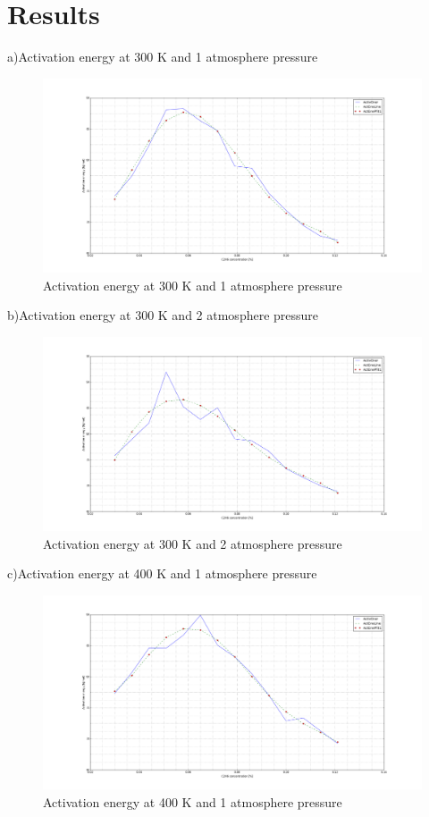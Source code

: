 \documentclass[a4paper]{article}
\begin{document}
\section{Results}

\hspace{5,5mm} a)Activation energy  at 300 K and 1 atmosphere pressure
\begin{figure}[ht]
\includegraphics[width=1\textwidth]{figure_1.png}
\caption{Activation energy  at 300 K and 1 atmosphere pressure}
\end{figure}

\hspace{5,5mm} b)Activation energy  at 300 K and 2 atmosphere pressure
\begin{figure}[ht]
\includegraphics[width=1\textwidth]{figure_2.png}
\caption{Activation energy  at 300 K and 2 atmosphere pressure}
\end{figure}

\hspace{5,5mm} c)Activation energy  at 400 K and 1 atmosphere pressure
\begin{figure}[ht]
\includegraphics[width=1\textwidth]{figure_3.png}
\caption{Activation energy  at 400 K and 1 atmosphere pressure}
\end{figure}
\end{document}
